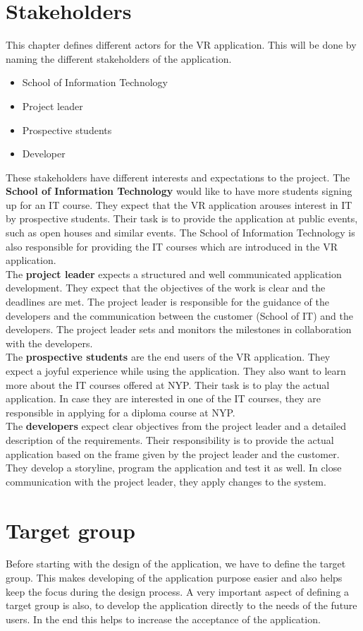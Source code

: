 \section{Stakeholders}
This chapter defines different actors for the VR application. This will be done by naming the different stakeholders of the application.
\begin{itemize}
\item School of Information Technology
\item Project leader
\item Prospective students
\item Developer
\end{itemize}
These stakeholders have different interests and expectations to the project. The \textbf{School of Information Technology} would like to have more students signing up for an IT course. They expect that the VR application arouses interest in IT by prospective students. Their task is to provide the application at public events, such as open houses and similar events. The School of Information Technology is also responsible for providing the IT courses which are introduced in the VR application. \\
The \textbf{project leader} expects a structured and well communicated application development. They expect that the objectives of the work is clear and the deadlines are met. The project leader is responsible for the guidance of the developers and the communication between the customer (School of IT) and the developers. The project leader sets and monitors the milestones in collaboration with the developers.\\
The \textbf{prospective students} are the end users of the VR application. They expect a joyful experience while using the application. They also want to learn more about the IT courses offered at NYP. Their task is to play the actual application. In case they are interested in one of the IT courses, they are responsible in applying for a diploma course at NYP.\\
The \textbf{developers} expect clear objectives from the project leader and a detailed description of the requirements. Their responsibility is to provide the actual application based on the frame given by the project leader and the customer. They develop a storyline, program the application and test it as well. In close communication with the project leader, they apply changes to the system.
\section{Target group}
Before starting with the design of the application, we have to define the target group. This makes developing of the application purpose easier and also helps keep the focus during the design process. A very important aspect of defining a target group is also, to develop the application directly to the needs of the future users. In the end this helps to increase the acceptance of the application. 

